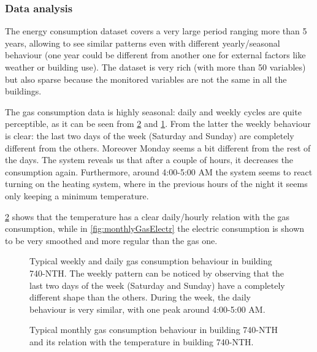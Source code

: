 \documentclass{sig-alternate-sigmod07}
\begin{document}
\subsubsection{Data analysis}
\label{sec:dataAnalysis}

The energy consumption dataset covers a very large period ranging more than 5 years, allowing to see similar patterns even with different yearly/seasonal behaviour (one year could be different from another one for external factors like weather or building use). The dataset is very rich (with more than 50 variables) but also sparse because the monitored variables are not the same in all the buildings.

The gas consumption data is highly seasonal: daily and weekly cycles are quite perceptible, as it can be seen from \cref{fig:monthlyTGas} and \cref{fig:dailyBehaviour}. From the latter the weekly behaviour is clear: the last two days of the week (Saturday and Sunday) are completely different from the others. Moreover Monday seems a bit different from the rest of the days. The system reveals us that after a couple of hours, it decreases the consumption again. Furthermore, around 4:00-5:00 AM the system seems to react turning on the heating system, where in the previous hours of the night it seems only keeping a minimum temperature. 

\cref{fig:monthlyTGas} shows that the temperature has a clear daily/hourly relation with the gas consumption, while in \cref{fig:monthlyGasElectr} the electric consumption is shown to be very smoothed and more regular than the gas one.


\begin{figure}[h!]
\centering
{}
\caption{Typical weekly and daily gas consumption behaviour in building 740-NTH. The weekly pattern can be noticed by observing that the last two days of the week (Saturday and Sunday) have a completely different shape than the others. During the week, the daily behaviour is very similar, with one peak around 4:00-5:00 AM.}
\label{fig:dailyBehaviour}
\end{figure}

\begin{figure}[h!]
\centering
{}
\caption{Typical monthly gas consumption behaviour in building 740-NTH and its relation with the temperature in building 740-NTH.}
\label{fig:monthlyTGas}
\end{figure}
\end{document}
